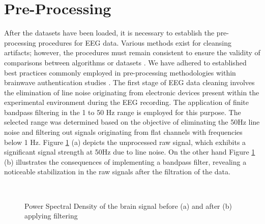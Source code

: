 \section{Pre-Processing}
\label{sec:Framework:Pre-Processing}
After the datasets have been loaded, it is necessary to establish the pre-processing procedures for EEG data. Various methods exist for cleansing artifacts; however, the procedures must remain consistent to ensure the validity of comparisons between algorithms or datasets \cite{moabb}. 
We have adhered to established best practices commonly employed in pre-processing methodologies within brainwave authentication studies \cite{survey_brain_biometrics}. 
The first stage of EEG data cleaning involves the elimination of line noise originating from electronic devices present within the experimental environment during the EEG recording. The application of finite bandpass filtering in the 1 to 50 Hz range is employed for this purpose. The selected range was determined based on the objective of eliminating the 50Hz line noise and filtering out signals originating from flat channels with frequencies below 1 Hz. Figure \ref{fig:PSD strength after band pass filtering} (a) depicts the unprocessed raw signal, which exhibits a significant signal strength at 50Hz due to line noise. On the other hand Figure \ref{fig:PSD strength after band pass filtering} (b) illustrates the consequences of implementing a bandpass filter, revealing a noticeable stabilization in the raw signals after the filtration of the data.  
\begin{figure}
    \centering
    \\
    \caption{Power Spectral Density of the brain signal before (a) and after (b) applying filtering}
    \label{fig:PSD strength after band pass filtering}
\end{figure}
